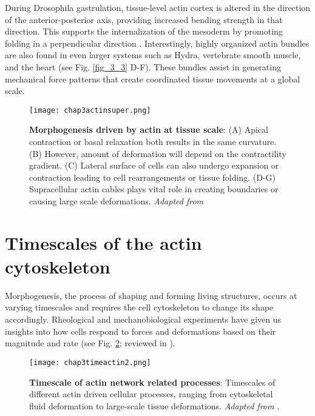 During Drosophila gastrulation, tissue-level actin cortex is altered in the direction of the anterior-posterior axis, providing increased bending strength in that direction. This supports the internalization of the mesoderm by promoting folding in a perpendicular direction \cite{yevick2019}. Interestingly, highly organized actin bundles are also found in even larger systems such as Hydra, vertebrate smooth muscle, and the heart \cite{maroudas-sacks2021, palmer2021, cetera2014, helm2005} (see Fig. \ref{fig_3_3} D-F). These bundles assist in generating mechanical force patterns that create coordinated tissue movements at a global scale.


\begin{figure}
	\centering
	\texttt{[image: chap3actinsuper.png]}
	\caption{\label{fig_3_4} \textbf{Morphogenesis driven by actin at tissue scale}: (A) Apical contraction or basal relaxation both results in the same curvature. (B) However, amount of deformation will depend on the contractility gradient. (C) Lateral surface of cells can also undergo expansion or contraction leading to cell rearrangements or tissue folding. (D-G) Supracellular actin cables plays vital role in creating boundaries or causing large scale deformations. \textit{Adapted from \cite{clarke2021}}
	}
\end{figure}

\hypertarget{timescales-of-the-actin-cytoskeleton}{%
	\section{Timescales of the actin
		cytoskeleton}\label{timescales-of-the-actin-cytoskeleton}}

Morphogenesis, the process of shaping and forming living structures, occurs at varying timescales and requires the cell cytoskeleton to change its shape accordingly. Rheological and mechanobiological experiments have given us insights into how cells respond to forces and deformations based on their magnitude and rate (see Fig. \ref{fig_3_5}; reviewed in \cite{wyatt2016}).

\begin{figure}
	\centering
	\texttt{[image: chap3timeactin2.png]}
	\caption{\label{fig_3_5} 
		\textbf{Timescale of actin network related processes}: Timescales of different actin driven cellular processes, ranging from cytoskeletal fluid deformation to large-scale tissue deformations. \textit{Adapted from \cite{kelkar2020}}.}
\end{figure}

